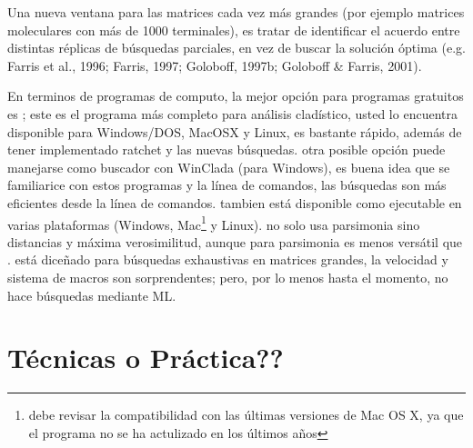 Una nueva ventana para las matrices cada vez m\'as grandes (por ejemplo matrices moleculares con m\'as de 1000 terminales),  es tratar de identificar el acuerdo entre distintas r\'eplicas de b\'usquedas parciales,  en vez de buscar la soluci\'on \'optima {\color{red}(e.g. Farris et al.,  1996; Farris,  1997; Goloboff,  1997b; Goloboff \& Farris,  2001)}. 

En terminos de programas de computo,  la mejor opci\'on para programas gratuitos es ; este es el programa m\'as  completo para an\'alisis clad\'istico,  usted lo encuentra disponible para Windows/DOS,  MacOSX y Linux,   es bastante r\'apido,   adem\'as de tener implementado ratchet y las nuevas b\'usquedas.   otra posible opci\'on puede manejarse como buscador con WinClada (para Windows),  es buena idea que se familiarice con estos programas y la l\'inea de comandos, las b\'usquedas son m\'as eficientes desde la l\'inea de comandos.   tambien est\'a disponible como ejecutable en varias plataformas (Windows,  Mac\footnote{debe revisar la compatibilidad con las \'ultimas versiones de Mac OS X, ya que el programa no se ha actulizado en los \'ultimos a\~nos} y Linux).    no solo usa parsimonia sino distancias y m\'axima verosimilitud, aunque para parsimonia es menos vers\'atil que .   est\'a dice\~nado para b\'usquedas exhaustivas en matrices grandes, la velocidad y sistema de macros son sorprendentes; pero,  por lo menos hasta el momento, no hace b\'usquedas mediante ML.


\section*{T\'ecnicas o Pr\'actica??}

